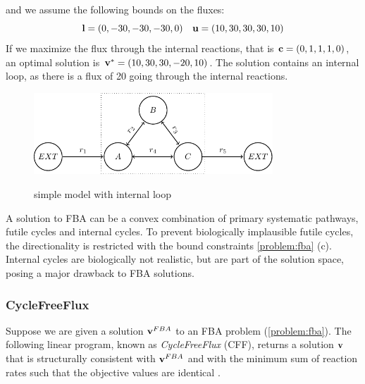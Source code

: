 \quad and we assume the following bounds on the fluxes: 
\begin{equation} \label{Eq:bounds_loop}
    \bold l = (0,-30,-30,-30,0) \quad \bold u = (10,30,30,30,10)
\end{equation}
If we maximize the flux through the internal reactions, that is $\bold c = (0,1,1,1,0)$, an optimal solution is $\bold v^* = (10, 30, 30, -20, 10)$. The solution contains an internal loop, as there is a flux of 20 going through the internal reactions.

\begin{figure}[h!]
    \caption{simple model with internal loop}
    \centering
    \includegraphics[width=0.8\textwidth]{Images/tikz_graphs_one_loop.pdf}
    \label{fig:loop}
\end{figure}

A solution to FBA can be a convex combination of primary systematic pathways, futile cycles and internal cycles. To prevent biologically implausible futile cycles, the directionality is restricted with the bound constraints \cref{problem:fba} (c). Internal cycles are biologically not realistic, but are part of the solution space, posing a major drawback to FBA solutions. 


\subsubsection{CycleFreeFlux}
Suppose we are given a solution $\bold v^{FBA}$ to an FBA problem (\cref{problem:fba}). 
The following linear program, known as \textit{CycleFreeFlux} (CFF), returns a solution $\bold v$ that is structurally consistent with $\bold v^{FBA}$ and with the minimum sum of reaction rates such that the objective values are identical \cite{desouki_cyclefreeflux_2015-1}. 

